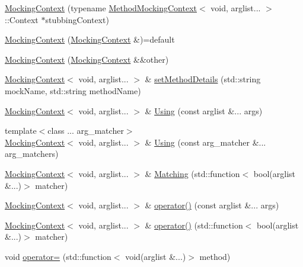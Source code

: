 \begin{DoxyCompactItemize}
\item 
\mbox{\hyperlink{classfakeit_1_1MockingContext_3_01void_00_01arglist_8_8_8_01_4_a655f7e31674dfb282f30a94f31ffd2a7}{Mocking\+Context}} (typename \mbox{\hyperlink{classfakeit_1_1MethodMockingContext}{Method\+Mocking\+Context}}$<$ void, arglist... $>$\+::Context $\ast$stubbing\+Context)
\item 
\mbox{\hyperlink{classfakeit_1_1MockingContext_3_01void_00_01arglist_8_8_8_01_4_a750dcc8fb80a9931c41143ce73d7177c}{Mocking\+Context}} (\mbox{\hyperlink{classfakeit_1_1MockingContext}{Mocking\+Context}} \&)=default
\item 
\mbox{\hyperlink{classfakeit_1_1MockingContext_3_01void_00_01arglist_8_8_8_01_4_a1f7b3663809191b919290f0db05d59f1}{Mocking\+Context}} (\mbox{\hyperlink{classfakeit_1_1MockingContext}{Mocking\+Context}} \&\&other)
\item 
\mbox{\hyperlink{classfakeit_1_1MockingContext}{Mocking\+Context}}$<$ void, arglist... $>$ \& \mbox{\hyperlink{classfakeit_1_1MockingContext_3_01void_00_01arglist_8_8_8_01_4_a5479ea5b1a1f32898cc9592bfb1c7777}{set\+Method\+Details}} (std\+::string mock\+Name, std\+::string method\+Name)
\item 
\mbox{\hyperlink{classfakeit_1_1MockingContext}{Mocking\+Context}}$<$ void, arglist... $>$ \& \mbox{\hyperlink{classfakeit_1_1MockingContext_3_01void_00_01arglist_8_8_8_01_4_a0dad4e59214a5fdcacad0e4a170df071}{Using}} (const arglist \&... args)
\item 
{\footnotesize template$<$class ... arg\+\_\+matcher$>$ }\\\mbox{\hyperlink{classfakeit_1_1MockingContext}{Mocking\+Context}}$<$ void, arglist... $>$ \& \mbox{\hyperlink{classfakeit_1_1MockingContext_3_01void_00_01arglist_8_8_8_01_4_aaab0ad3883ab87bd3885671e3266546e}{Using}} (const arg\+\_\+matcher \&... arg\+\_\+matchers)
\item 
\mbox{\hyperlink{classfakeit_1_1MockingContext}{Mocking\+Context}}$<$ void, arglist... $>$ \& \mbox{\hyperlink{classfakeit_1_1MockingContext_3_01void_00_01arglist_8_8_8_01_4_a28152fc4e0105f5e6424515367a5d4c3}{Matching}} (std\+::function$<$ bool(arglist \&...)$>$ matcher)
\item 
\mbox{\hyperlink{classfakeit_1_1MockingContext}{Mocking\+Context}}$<$ void, arglist... $>$ \& \mbox{\hyperlink{classfakeit_1_1MockingContext_3_01void_00_01arglist_8_8_8_01_4_a73476d376f7ec5631ba9a37ff5264599}{operator()}} (const arglist \&... args)
\item 
\mbox{\hyperlink{classfakeit_1_1MockingContext}{Mocking\+Context}}$<$ void, arglist... $>$ \& \mbox{\hyperlink{classfakeit_1_1MockingContext_3_01void_00_01arglist_8_8_8_01_4_a1a5a55569a763877d395635979e6b3d6}{operator()}} (std\+::function$<$ bool(arglist \&...)$>$ matcher)
\item 
void \mbox{\hyperlink{classfakeit_1_1MockingContext_3_01void_00_01arglist_8_8_8_01_4_a86584df9e9a7a73b078ad68fa5893d50}{operator=}} (std\+::function$<$ void(arglist \&...)$>$ method)
\end{DoxyCompactItemize}

